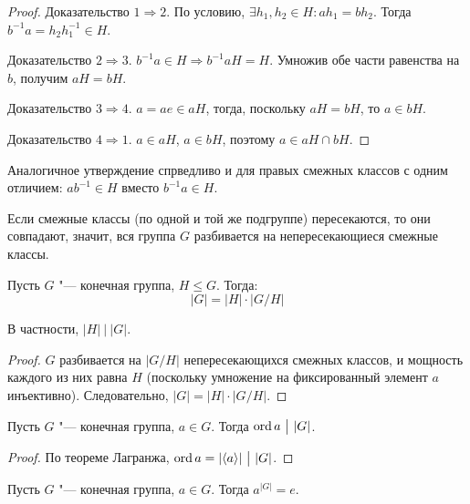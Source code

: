 \begin{proof}
	Доказательство $1 \Rightarrow 2$. По условию, $\exists h_1, h_2 \in H: ah_1 = bh_2$. Тогда $b^{-1}a = h_2h_1^{-1} \in H$.
	
	Доказательство $2 \Rightarrow 3$. $b^{-1}a \in H \Rightarrow b^{-1}aH = H$. Умножив обе части равенства на $b$, получим $aH = bH$.
	
	Доказательство $3 \Rightarrow 4$. $a = ae \in aH$, тогда, поскольку $aH = bH$, то $a \in bH$.
	
	Доказательство $4 \Rightarrow 1$. $a \in aH$, $a \in bH$, поэтому $a \in aH \cap bH$.
\end{proof}

\begin{note}
	Аналогичное утверждение спрведливо и для правых смежных классов с одним отличием: $ab^{-1} \in H$ вместо $b^{-1}a \in H$.
\end{note}

\begin{corollary}
	Если смежные классы (по одной и той же подгруппе) пересекаются, то они совпадают, значит, вся группа $G$ разбивается на непересекающиеся смежные классы.
\end{corollary}

\begin{theorem}[Лагранжа]
	Пусть $G$ "--- конечная группа, $H \le G$. Тогда:
	\[|G| = |H|\cdot|G/H|\]
	
	В частности, $|H|~\big|~|G|$.
\end{theorem}

\begin{proof}
	$G$ разбивается на $|G/H|$ непересекающихся смежных классов, и мощность каждого из них равна $H$ (поскольку умножение на фиксированный элемент $a$ инъективно). Следовательно, $|G| = |H|\cdot|G/H|$.
\end{proof}

\begin{corollary}
	Пусть $G$ "--- конечная группа, $a \in G$. Тогда $\operatorname{ord}{a}~\big|~|G|$.
\end{corollary}

\begin{proof}
	По теореме Лагранжа, $\operatorname{ord}{a} = |\langle a\rangle|~\big|~|G|$.
\end{proof}

\begin{corollary}
	Пусть $G$ "--- конечная группа, $a \in G$. Тогда $a^{|G|} = e$.
\end{corollary}

